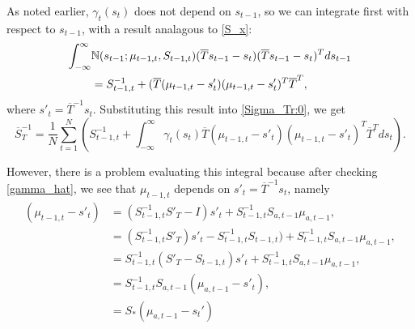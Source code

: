 \documentclass[12pt,leqno]{article}
\begin{document}
As noted earlier, $\gamma_t(s_t)$ does not depend on $s_{t-1}$, so we can integrate first with respect to $s_{t-1}$, with
a result analagous to \eqref{S_x}:
\begin{align*}
  \int_{-\infty}^{\infty}&{\mathbb N}(s_{t-1};\mu_{t-1,t},S_{t-1,t})(\overline{T}s_{t-1}-s_t)
  (\overline{T}s_{t-1}-s_t)^Tds_{t-1}\\ &= S_{t-1,t}^{-1} +
(\overline{T}(\mu_{t-1,t}-s'_t)(\mu_{t-1,t}-s'_t)^T\overline{T}^T,
\end{align*}
where $s'_t = \overline{T}^{-1}s_t$.
Substituting this result into \eqref{Sigma_Tr:0}, we get
\begin{equation}\label{Sigma_Tr:1}
  \overline{S}_T^{-1} =  \frac{1}{N}\sum_{t=1}^N\left(S_{t-1,t}^{-1} +\int_{-\infty}^{\infty}\gamma_t(s_t)
  \overline{T}(\mu_{t-1,t}-s'_t)(\mu_{t-1,t}-s'_t)^T\overline{T}^Tds_t\right).
\end{equation}

However, there is a problem evaluating this integral because after checking \eqref{gamma_hat}, we see that $\mu_{t-1,t}$
depends on $s'_t = \overline{T}^{-1}s_t$, namely 
\begin{equation}\label{s-mu_1}
  \begin{split}
    \left(\mu_{t-1,t}-s'_t\right) &= (S_{t-1,t}^{-1}S'_T - I)s'_t + S_{t-1,t}^{-1}S_{a,t-1}\mu_{a,t-1}, \\
    &= (S_{t-1,t}^{-1}S'_T)s'_t - S_{t-1,t}^{-1}S_{t-1,t}) + S_{t-1,t}^{-1}S_{a,t-1}\mu_{a,t-1}, \\
    &= S_{t-1,t}^{-1}(S'_T - S_{t-1,t} )s'_t + S_{t-1,t}^{-1}S_{a,t-1}\mu_{a,t-1}, \\
    &= S_{t-1,t}^{-1}S_{a,t-1}(\mu_{a,t-1}-s'_t),\\
    &= S_*(\mu_{a,t-1}-s_t')
  \end{split}
\end{equation}
\end{document}
